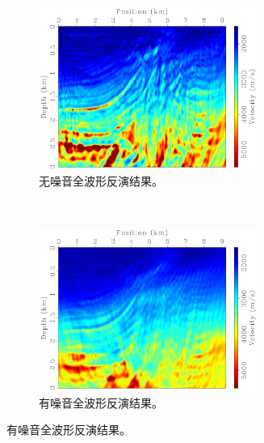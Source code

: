 \documentclass[degree=doctor]{thuthesis}
\begin{document}
\begin{figure}[ht]
    \centering
    \begin{subfigure}[b]{0.5\textwidth}
        \centering
        \includegraphics[height=2.1in]{fwi.pdf}
        \caption{无噪音全波形反演结果。}
        \label{fig:无噪音全波形反演结果}
    \end{subfigure}%
    ~
    \begin{subfigure}[b]{0.5\textwidth}
        \centering
        \includegraphics[height=2.1in]{fwi-noise.pdf}
        \caption{有噪音全波形反演结果。}
        \label{fig:有噪音全波形反演结果}
    \end{subfigure}
\end{figure}
\end{document}
